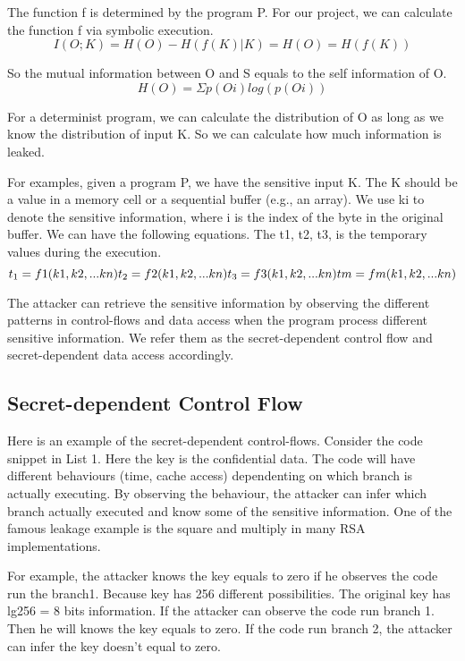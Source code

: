 The function f is determined by the program P. For our project, we can calculate the function f via symbolic execution.
\begin{equation}
I(O; K) = H(O) - H(f(K)|K) = H(O) = H(f(K))
\end{equation}

So the mutual information between O and S equals to the self information of O. 
\begin{equation}
H(O) = Σp(Oi)log(p(Oi))
\end{equation}

For a determinist program, we can calculate the distribution of O as long as we know the distribution of input K. 
So we can calculate how much information is leaked.

For examples, given a program P, we have the sensitive input K. The K should be a value in a memory cell or a sequential buffer (e.g., an array). We use ki to denote the sensitive information, where i is the index of the byte in the original buffer.  We can have the following equations. The t1, t2, t3, is the temporary values during the execution.
\begin{equation}
t_1 = f1(k1, k2, ... kn)\\
t_2 = f2(k1, k2, ... kn)\\
t_3 = f3(k1, k2, ... kn)\\
tm = fm(k1, k2, ... kn)
\end{equation}

The attacker can retrieve the sensitive information by observing the different patterns in control-flows and data access when the program process different sensitive information. We refer them as the secret-dependent control flow and secret-dependent data access accordingly.

\subsection{Secret-dependent Control Flow}
Here is an example of the secret-dependent control-flows. Consider the code snippet in List 1. Here the key is the confidential data. The code will have different behaviours (time, cache access) dependenting on which branch is actually executing. By observing the behaviour, the attacker can infer which branch actually executed and know some of the sensitive information. One of the famous leakage example is the square and multiply in many RSA implementations. 

For example, the attacker knows the key equals to zero if he observes the code run the branch1. Because key has 256 different possibilities. The original key has lg256 = 8 bits information. If the attacker can observe the code run branch 1. Then he will knows the key equals to zero. If the code run branch 2, the attacker can infer the key doesn’t equal to zero. 

